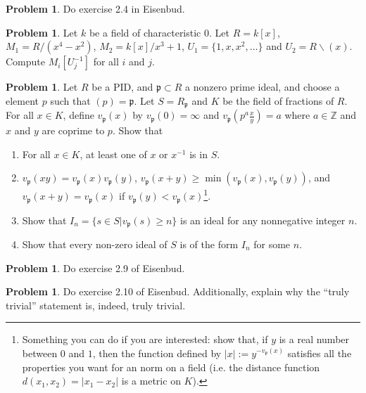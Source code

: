 \documentclass[11pt]{article}
\theoremstyle{definition}
\newtheorem{problem}[theorem]{Problem}
\theoremstyle{definition}
\newcommand{\Z}{\mathbb{Z}}
\begin{document}
\begin{problem}
Do exercise 2.4 in Eisenbud.
\end{problem}
\begin{problem}
Let $k$ be a field of characteristic $0$.  Let $R = k[x]$, $M_1 = R/(x^4-x^2)$, $M_2 = k[x]/x^3 + 1$, $U_1 = \{1, x, x^2, \ldots\}$ and $U_2 = R\backslash (x)$.  Compute $M_i[U_j^{-1}]$ for all $i$ and $j$.
\end{problem}
\begin{problem}
Let $R$ be a PID, and $\mathfrak{p} \subset R$ a nonzero prime ideal, and choose a element $p$ such that $(p) = \mathfrak{p}$.  Let $S = R_{\mathfrak{p}}$ and $K$ be the field of fractions of $R$.  For all $x \in K$, define $v_\mathfrak{p}(x)$ by $v_{\mathfrak{p}}(0) = \infty$ and $v_{\mathfrak{p}}(p^a\frac{x}{y}) = a$ where $a \in \Z$ and $x$ and $y$ are coprime to $p$.  Show that
\begin{enumerate}[label=(\alph*)]
\item For all $x \in K$, at least one of $x$ or $x^{-1}$ is in $S$.
\item $v_{\mathfrak{p}}(xy) = v_{\mathfrak{p}}(x)v_{\mathfrak{p}}(y)$, $v_{\mathfrak{p}}(x+y) \geq \min(v_{\mathfrak{p}}(x), v_{\mathfrak{p}}(y))$, and $v_{\mathfrak{p}}(x+y) = v_{\mathfrak{p}}(x)$ if $v_{\mathfrak{p}}(y) < v_{\mathfrak{p}}(x)$\footnote{Something you can do if you are interested: show that, if $y$ is a real number between $0$ and $1$, then the function defined by $|x| := y^{-v_{\mathfrak{p}}(x)}$ satisfies all the properties you want for an norm on a field (i.e. the distance function $d(x_1, x_2) = |x_1-x_2|$ is a metric on $K$).}.
\item Show that $I_n = \{s\in S|v_{\mathfrak{p}}(s) \geq n\}$ is an ideal for any nonnegative integer $n$.
\item Show that every non-zero ideal of $S$ is of the form $I_n$ for some $n$.
\end{enumerate}
\end{problem}
\begin{problem}
Do exercise 2.9 of Eisenbud.
\end{problem}
\begin{problem}
Do exercise 2.10 of Eisenbud.  Additionally, explain why the ``truly trivial'' statement is, indeed, truly trivial.
\end{problem}
\end{document}
